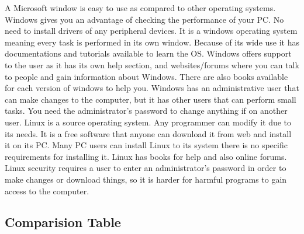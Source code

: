 \documentclass{scrreprt}
\begin{document}
A Microsoft window is easy to use as compared to other operating systems. Windows gives you an
advantage of checking the performance of your PC. No need to install drivers of any peripheral devices.
It is a windows operating system meaning every task is performed in its own window. Because of its
wide use it has documentations and tutorials available to learn the OS. Windows offers support to the
user as it has its own help section, and websites/forums where you can talk to people and gain
information about Windows. There are also books available for each version of windows to help you.
Windows has an administrative user that can make changes to the computer, but it has other users that
can perform small tasks. You need the administrator’s password to change anything if on another user.
\newline
Linux is a source operating system. Any programmer can modify it due to its needs. It is a free software
that anyone can download it from web and install it on its PC. Many PC users can install Linux to its
system there is no specific requirements for installing it. Linux has books for help and also online forums.
Linux security requires a user to enter an administrator’s password in order to make changes or
download things, so it is harder for harmful programs to gain access to the computer.

\subsection{Comparision Table}
\end{document}
